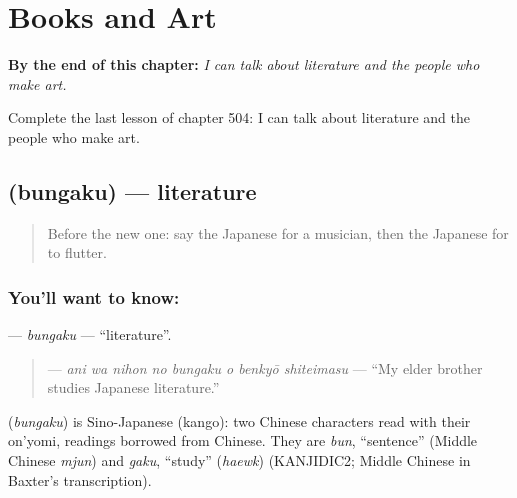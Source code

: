 
\chapter{Books and Art}
\label{ch:ja-books-and-art}

\begin{chapteropening}
\textbf{By the end of this chapter:} \emph{I can talk about literature and the people who make art.}

Complete the last lesson of chapter 504: I can talk about literature and the people who make art.
\end{chapteropening}

\section[\texorpdfstring{\ja{ぶんがく} (bungaku)}{ぶんがく (bungaku)}]{ (bungaku) — literature}

\label{lesson:JA-C504-bungaku}



\begin{quote}
Before the new one: say the Japanese for a musician, then the Japanese for to flutter.
\end{quote}

\subsection*{You'll want to know: }
\textbf{} — \emph{bungaku} — \textquotedblleft{}literature\textquotedblright{}.

\begin{quote}
\textbf{   } — \emph{ani wa nihon no bungaku o benkyō shiteimasu} — \textquotedblleft{}My elder brother studies Japanese literature.\textquotedblright{}
\end{quote}

\begin{cousinweb}
\textbf{} (\emph{bungaku}) is Sino-Japanese (kango): two Chinese characters read with their on'yomi, readings borrowed from Chinese. They are \emph{bun}, \textquotedblleft{}sentence\textquotedblright{} (Middle Chinese \emph{mjun}) and \emph{gaku}, \textquotedblleft{}study\textquotedblright{} (\emph{haewk}) (KANJIDIC2; Middle Chinese in Baxter's transcription).
\end{cousinweb}

